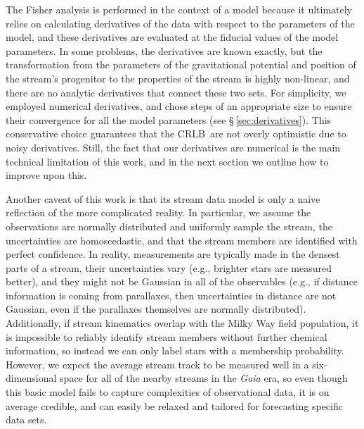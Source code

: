 \documentclass[modern]{aastex61}
\newcommand{\acronym}[1]{{\small{#1}}}
\newcommand{\CRLB}{\acronym{CRLB}}
\begin{document}
The Fisher analysis is performed in the context of a model because it ultimately relies on calculating derivatives of the data with respect to the parameters of the model, and these derivatives are evaluated at the fiducial values of the model parameters.
In some problems, the derivatives are known exactly, but the transformation from the parameters of the gravitational potential and position of the stream's progenitor to the properties of the stream is highly non-linear, and there are no analytic derivatives that connect these two sets.
For simplicity, we employed numerical derivatives, and chose steps of an appropriate size to ensure their convergence for all the model parameters (see \S\,\ref{sec:derivatives}).
This conservative choice guarantees that the \CRLB\ are not overly optimistic due to noisy derivatives.
Still, the fact that our derivatives are numerical is the main technical limitation of this work, and in the next section we outline how to improve upon this.

Another caveat of this work is that its stream data model is only a naive reflection of the more complicated reality. 
In particular, we assume the observations are normally distributed and uniformly sample the stream, the uncertainties are homoscedastic, and that the stream members are identified with perfect confidence. 
In reality, measurements are typically made in the densest parts of a stream, their uncertainties vary (e.g., brighter stars are measured better), and they might not be Gaussian in all of the observables (e.g., if distance information is coming from parallaxes, then uncertainties in distance are not Gaussian, even if the parallaxes themselves are normally distributed).
Additionally, if stream kinematics overlap with the Milky Way field population, it is impossible to reliably identify stream members without further chemical information, so instead we can only label stars with a membership probability.
However, we expect the average stream track to be measured well in a six-dimensional space for all of the nearby streams in the \emph{Gaia} era, so even though this basic model fails to capture complexities of observational data, it is on average credible, and can easily be relaxed and tailored for forecasting specific data sets.
\end{document}
